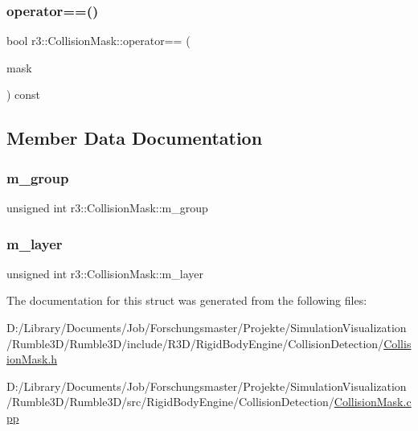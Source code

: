\mbox{\label{structr3_1_1_collision_mask_a7d1315f7324fc03cee09df2c364f5c54}} 
\subsubsection{\texorpdfstring{operator==()}{operator==()}}
{\footnotesize\ttfamily bool r3\+::\+Collision\+Mask\+::operator== (\begin{DoxyParamCaption}\item[{const \mbox{\hyperlink{structr3_1_1_collision_mask}{Collision\+Mask}} \&}]{mask }\end{DoxyParamCaption}) const}



\subsection{Member Data Documentation}
\mbox{\label{structr3_1_1_collision_mask_a07999f53c748c86623b00e4e07d24d5f}} 
\subsubsection{\texorpdfstring{m\+\_\+group}{m\_group}}
{\footnotesize\ttfamily unsigned int r3\+::\+Collision\+Mask\+::m\+\_\+group}

\mbox{\label{structr3_1_1_collision_mask_a4e3ed2227bb1782f7c6dc948a8427620}} 
\subsubsection{\texorpdfstring{m\+\_\+layer}{m\_layer}}
{\footnotesize\ttfamily unsigned int r3\+::\+Collision\+Mask\+::m\+\_\+layer}



The documentation for this struct was generated from the following files\+:\begin{DoxyCompactItemize}
\item 
D\+:/\+Library/\+Documents/\+Job/\+Forschungsmaster/\+Projekte/\+Simulation\+Visualization/\+Rumble3\+D/\+Rumble3\+D/include/\+R3\+D/\+Rigid\+Body\+Engine/\+Collision\+Detection/\mbox{\hyperlink{_collision_mask_8h}{Collision\+Mask.\+h}}\item 
D\+:/\+Library/\+Documents/\+Job/\+Forschungsmaster/\+Projekte/\+Simulation\+Visualization/\+Rumble3\+D/\+Rumble3\+D/src/\+Rigid\+Body\+Engine/\+Collision\+Detection/\mbox{\hyperlink{_collision_mask_8cpp}{Collision\+Mask.\+cpp}}\end{DoxyCompactItemize}
